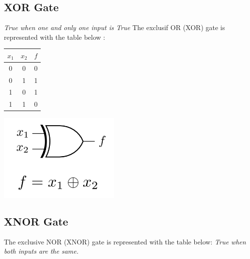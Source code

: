\documentclass[12pt,openany]{book}
\begin{document}
			      	\subsection{XOR Gate}
			      	\textit{True when one and only one input is True}\newline
			      	The exclusif OR (XOR) gate is represented with the table below :\newline
			      	\begin{minipage}[htp]{0.45\textwidth} %
			      		\centering
			      		\begin{tabular}{|c|c|c|}
			      			\hline
			      			\( x_1 \) & \( x_2 \) & \( f \) \\
			      			\hline
			      			0         & 0         & 0       \\
			      			0         & 1         & 1       \\
			      			1         & 0         & 1       \\
			      			1         & 1         & 0       \\
			      			\hline
			      		\end{tabular}
			      	\end{minipage}
			      	\hfill
					\vline
					\hfill
			      		\begin{minipage}[htp]{0.45\textwidth} %
			      			\centering
			      			\includegraphics[width=0.45\textwidth]{circuits/6.11.1.png} %
			      		\end{minipage}
	
			      	\subsection{XNOR Gate}
					The exclusive NOR (XNOR) gate is represented with the table below:
					\textit{True when both inputs are the same.}
					\newline
\end{document}
